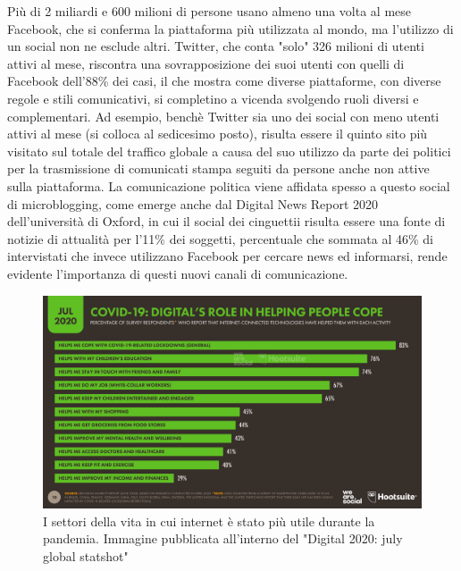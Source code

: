 Più di 2 miliardi e 600 milioni di persone usano almeno una volta al mese Facebook, che si conferma la piattaforma più utilizzata al mondo, ma l'utilizzo di un social non ne esclude altri. Twitter, che conta "solo" 326 milioni di utenti attivi al mese, riscontra una sovrapposizione dei suoi utenti con quelli di Facebook dell'88\% dei casi, il che mostra  come diverse piattaforme, con diverse regole e stili comunicativi, si completino a vicenda svolgendo ruoli  diversi e complementari. Ad esempio, benchè Twitter sia uno dei social con meno utenti attivi al mese (si colloca al sedicesimo posto), risulta essere il quinto sito più visitato sul totale del traffico globale a causa del suo utilizzo da parte dei politici per la trasmissione di comunicati stampa seguiti da persone anche non attive sulla piattaforma. La comunicazione politica viene affidata spesso a questo social di microblogging, come emerge anche dal Digital News Report 2020 \citep{newman2020} dell'università di Oxford, in cui il social dei cinguettii risulta essere una fonte di notizie di attualità per l'11\% dei soggetti, percentuale che sommata al 46\% di intervistati che invece utilizzano Facebook per cercare news ed informarsi, rende evidente l'importanza di questi nuovi canali di comunicazione.
\begin{figure}
	\includegraphics[width=\textwidth]{figures/usosocial2}
	\caption{I settori della vita in cui internet è stato più utile durante la pandemia. Immagine pubblicata all'interno del "Digital 2020: july global statshot"}
	\label{fig:usosocial2}
\end{figure}


